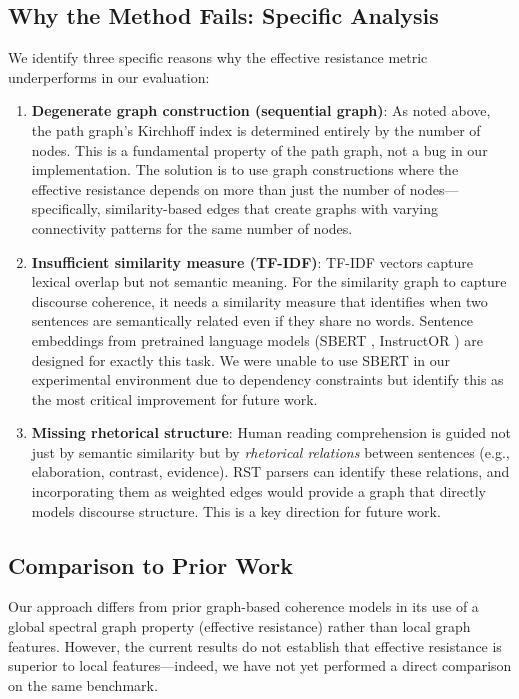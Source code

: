 \documentclass[11pt,letterpaper]{article}
\begin{document}
\subsection{Why the Method Fails: Specific Analysis}

We identify three specific reasons why the effective resistance metric underperforms in our evaluation:

\begin{enumerate}
    \item \textbf{Degenerate graph construction (sequential graph)}: As noted above, the path graph's Kirchhoff index is determined entirely by the number of nodes. This is a fundamental property of the path graph, not a bug in our implementation. The solution is to use graph constructions where the effective resistance depends on more than just the number of nodes---specifically, similarity-based edges that create graphs with varying connectivity patterns for the same number of nodes.
    
    \item \textbf{Insufficient similarity measure (TF-IDF)}: TF-IDF vectors capture lexical overlap but not semantic meaning. For the similarity graph to capture discourse coherence, it needs a similarity measure that identifies when two sentences are semantically related even if they share no words. Sentence embeddings from pretrained language models (SBERT \cite{Reimers2019}, InstructOR \cite{Su2023}) are designed for exactly this task. We were unable to use SBERT in our experimental environment due to dependency constraints but identify this as the most critical improvement for future work.
    
    \item \textbf{Missing rhetorical structure}: Human reading comprehension is guided not just by semantic similarity but by \textit{rhetorical relations} between sentences (e.g., elaboration, contrast, evidence). RST parsers can identify these relations, and incorporating them as weighted edges would provide a graph that directly models discourse structure. This is a key direction for future work.
\end{enumerate}

\subsection{Comparison to Prior Work}

Our approach differs from prior graph-based coherence models \cite{Mesgar2015, Guinaudeau2013} in its use of a global spectral graph property (effective resistance) rather than local graph features. However, the current results do not establish that effective resistance is superior to local features---indeed, we have not yet performed a direct comparison on the same benchmark.
\end{document}
